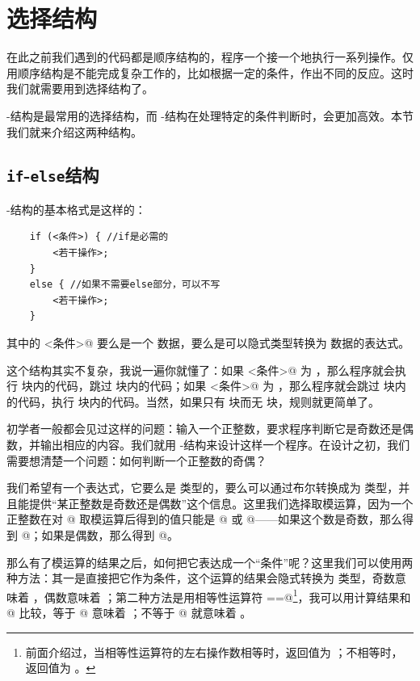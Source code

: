 \section{选择结构}
在此之前我们遇到的代码都是顺序结构的，程序一个接一个地执行一系列操作。仅用顺序结构是不能完成复杂工作的，比如根据一定的条件，作出不同的反应。这时我们就需要用到选择结构了。\par
\lstinline@if@-\lstinline@else@ 结构是最常用的选择结构，而 \lstinline@switch@-\lstinline@case@ 结构在处理特定的条件判断时，会更加高效。本节我们就来介绍这两种结构。\par
\subsection*{\texttt{if}-\texttt{else}结构}
\lstinline@if@-\lstinline@else@ 结构的基本格式是这样的：
\begin{lstlisting}
    if (<条件>) { //if是必需的
        <若干操作>;
    }
    else { //如果不需要else部分，可以不写
        <若干操作>;
    }
\end{lstlisting}
其中的 \lstinline@<条件>@ 要么是一个 \lstinline@bool@ 数据，要么是可以隐式类型转换为 \lstinline@bool@ 数据的表达式。\par
这个结构其实不复杂，我说一遍你就懂了：如果 \lstinline@<条件>@ 为 \lstinline@true@，那么程序就会执行 \lstinline@if@ 块内的代码，跳过 \lstinline@else@ 块内的代码；如果 \lstinline@<条件>@ 为 \lstinline@false@，那么程序就会跳过 \lstinline@if@ 块内的代码，执行 \lstinline@else@ 块内的代码。当然，如果只有 \lstinline@if@ 块而无 \lstinline@else@ 块，规则就更简单了。\par
初学者一般都会见过这样的问题：输入一个正整数，要求程序判断它是奇数还是偶数，并输出相应的内容。我们就用 \lstinline@if@-\lstinline@else@ 结构来设计这样一个程序。在设计之初，我们需要想清楚一个问题：如何判断一个正整数的奇偶？\par
我们希望有一个表达式，它要么是 \lstinline@bool@ 类型的，要么可以通过布尔转换成为 \lstinline@bool@ 类型，并且能提供``某正整数是奇数还是偶数''这个信息。这里我们选择取模运算，因为一个正整数在对 @ 取模运算后得到的值只能是 @ 或 @——如果这个数是奇数，那么得到 @；如果是偶数，那么得到 @。\par
那么有了模运算的结果之后，如何把它表达成一个``条件''呢？这里我们可以使用两种方法：其一是直接把它作为条件，这个运算的结果会隐式转换为 \lstinline@bool@ 类型，奇数意味着 \lstinline@true@，偶数意味着 \lstinline@false@；第二种方法是用相等性运算符 \lstinline@==@\footnote{前面介绍过，当相等性运算符的左右操作数相等时，返回值为 \lstinline@true@；不相等时，返回值为 \lstinline@false@。}，我可以用计算结果和 @ 比较，等于 @ 意味着 \lstinline@true@；不等于 @ 就意味着 \lstinline@false@。\par
